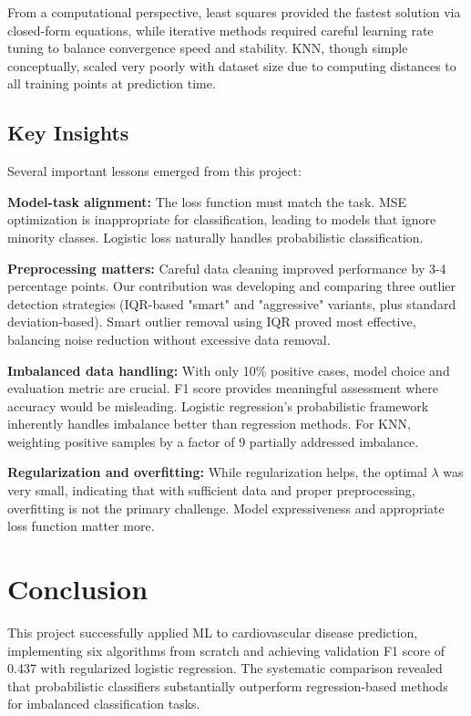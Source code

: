 \documentclass[10pt,conference,compsocconf]{IEEEtran}
\begin{document}
From a computational perspective, least squares provided the fastest solution via closed-form equations, while iterative methods required careful learning rate tuning to balance convergence speed and stability. KNN, though simple conceptually, scaled very poorly with dataset size due to computing distances to all training points at prediction time.

\subsection{Key Insights}

Several important lessons emerged from this project:

\textbf{Model-task alignment:} The loss function must match the task. MSE optimization is inappropriate for classification, leading to models that ignore minority classes. Logistic loss naturally handles probabilistic classification.

\textbf{Preprocessing matters:} Careful data cleaning improved performance by 3-4 percentage points. Our contribution was developing and comparing three outlier detection strategies (IQR-based "smart" and "aggressive" variants, plus standard deviation-based). Smart outlier removal using IQR proved most effective, balancing noise reduction without excessive data removal.

\textbf{Imbalanced data handling:} With only 10\% positive cases, model choice and evaluation metric are crucial. F1 score provides meaningful assessment where accuracy would be misleading. Logistic regression's probabilistic framework inherently handles imbalance better than regression methods. For KNN, weighting positive samples by a factor of 9 partially addressed imbalance.

\textbf{Regularization and overfitting:} While regularization helps, the optimal $\lambda$ was very small, indicating that with sufficient data and proper preprocessing, overfitting is not the primary challenge. Model expressiveness and appropriate loss function matter more.

\section{Conclusion}

This project successfully applied ML to cardiovascular disease prediction, implementing six algorithms from scratch and achieving validation F1 score of 0.437 with regularized logistic regression. The systematic comparison revealed that probabilistic classifiers substantially outperform regression-based methods for imbalanced classification tasks.
\end{document}
